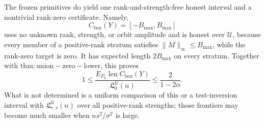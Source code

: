 The frozen primitives do yield one rank-and-strength-free honest interval and a
nontrivial rank-zero certificate.  Namely,
\[
C_{\mathrm{box}}(Y)=[-B_{\max},B_{\max}]
\]
uses no unknown rank, strength, or orbit amplitude and is honest over
\(\mathcal U\), because every member of a positive-rank stratum satisfies
\(\lVert M\rVert_\infty\leq B_{\max}\), while the rank-zero target is zero.
It has expected length \(2B_{\max}\) on every stratum.  Together with
\(\mathrm{thm:union-zero-lower}\), this proves
\[
1\leq
\frac{E_{P_0}\operatorname{len}C_{\mathrm{box}}(Y)}
{\mathfrak L_0^{\mathcal U}(n)}
\leq\frac{2}{1-2\alpha}.
\]
What is not determined is a uniform comparison of this or a test-inversion
interval with \(\mathfrak L_{r,s}^{\mathcal U}(n)\) over all positive-rank
strengths; those frontiers may become much smaller when \(n s^2/\sigma^2\) is
large.